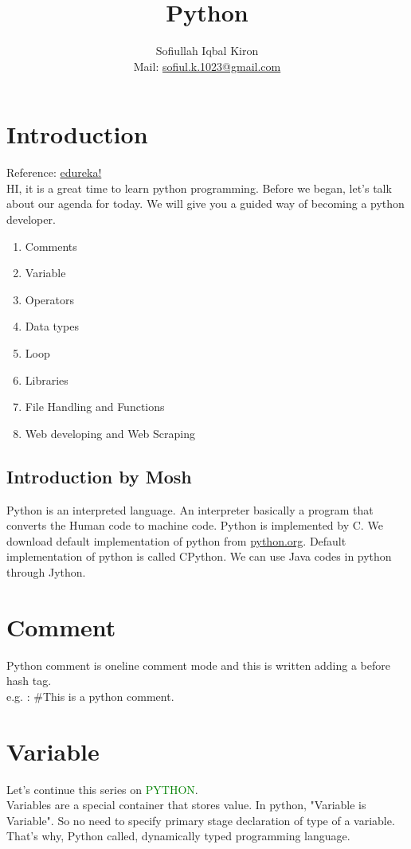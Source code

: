 \documentclass[11 pt, letterpaper]{report}
\title{Python}
\author
{
 Sofiullah Iqbal Kiron\\
 Mail: \href{mailto:sofiul.k.1023@gmail.com}{sofiul.k.1023@gmail.com}
}
\affil{BSMRSTU, Department of CSE}
\begin{document}
\maketitle
\tableofcontents

\section{Introduction}
Reference: \href{https://www.youtube.com/watch?v=WGJJIrtnfpk&t=12362s}{edureka!}\\
HI, it is a great time to learn python programming. Before we began, let's talk about our agenda for today. We will give you a guided way of becoming a python developer.\\
\begin{enumerate}
 \item Comments
 \item Variable
 \item Operators
 \item Data types
 \item Loop
 \item Libraries
 \item File Handling and Functions
 \item Web developing and Web Scraping
\end{enumerate}

\subsection{Introduction by Mosh}
Python is an interpreted language. An interpreter basically a program that converts the Human code to machine code. Python is implemented by C. We download default implementation of python from \href{python official website}{python.org}. Default implementation of python is called CPython. We can use Java codes in python through Jython.

\section{Comment}
Python comment is oneline comment mode and this is written adding a before hash tag. \\
e.g. : \#This is a python comment.

\section{Variable}
Let's continue this series on \textcolor{green}{PYTHON}. \\
Variables are a special container that stores value. In python, "Variable is Variable". So no need to specify primary stage declaration of type of a variable. That's why, Python called, dynamically typed programming language.
\end{document}
